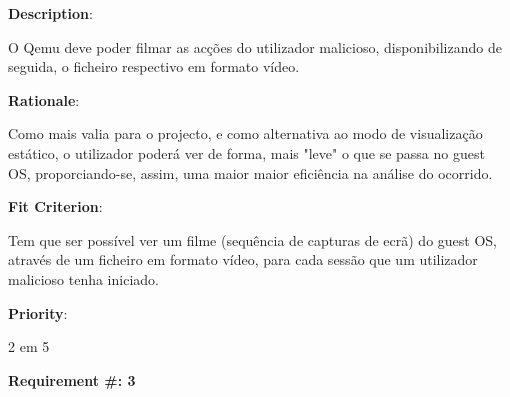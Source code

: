 \begin{description}
\item \textbf{Description}:

O Qemu deve poder filmar as acções do utilizador malicioso, disponibilizando de seguida, o ficheiro respectivo em formato vídeo.\\


\item \textbf{Rationale}:

Como mais valia para o projecto, e como alternativa ao modo de visualização estático, o utilizador poderá ver de forma, mais "leve" o que
se passa no guest OS, proporciando-se, assim, uma maior maior eficiência na análise do ocorrido.


\item \textbf{Fit Criterion}:

Tem que ser possível ver um filme (sequência de capturas de ecrã) do guest OS, através de um ficheiro em formato vídeo,
para cada sessão que um utilizador malicioso tenha iniciado.

\item \textbf{Priority}:

2 em 5

\end{description}

\pagebreak






\begin{minipage}{0.55\textwidth}
\begin{flushleft}\textbf{Requirement \#: 3}\end{flushleft}
\end{minipage}
\begin{minipage}{0.4\textwidth}
\end{minipage}

